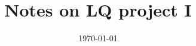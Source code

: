 \documentclass[aps,preprint,tightenlines,floatfix,superscriptaddress,nofootinbib,showpacs]{revtex4-1}
\begin{document}
\vspace*{2cm}

\title{{\boldmath Notes on LQ project I}}



\def\laplata{\affiliation{\it IFLP, CONICET -- Dpto. de F\'{\i}sica,
    Universidad Nacional de La Plata, C.C. 67, 1900 La Plata,
    Argentina \vspace*{8mm}}}




\date{\vspace*{2mm}\today \\\bigskip\bigskip}
\maketitle
\end{document}
